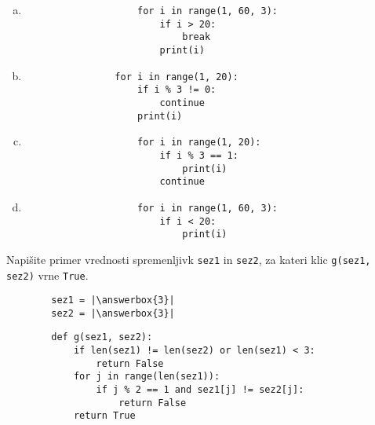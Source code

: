 \documentclass[arhiv, 10pt]{../izpit}
\newcommand{\inlinepy}[1]{\texttt{#1}}
\newcommand{\answerbox}[1]{\framebox{\vphantom{\large M}\hspace{#1cm}}}
\begin{document}
        \begin{multicols}{2}
        \begin{enumerate}[(a)]
\item 
                \begin{verbatim}
                    for i in range(1, 60, 3):
                        if i > 20:
                            break
                        print(i)
                \end{verbatim}
            
\item 
            \begin{verbatim}
                for i in range(1, 20):
                    if i % 3 != 0:
                        continue
                    print(i)
            \end{verbatim}
        
\item 
                \begin{verbatim}
                    for i in range(1, 20):
                        if i % 3 == 1:
                            print(i)
                        continue
                \end{verbatim}
            
\item 
                \begin{verbatim}
                    for i in range(1, 60, 3):
                        if i < 20:
                            print(i)
                \end{verbatim}
            
\end{enumerate}

        \end{multicols}
    
        \naloga*
        \begin{multicols}{2}
        \noindent
        Napišite primer vrednosti spremenljivk \inlinepy{sez1} in \inlinepy{sez2}, za kateri klic \inlinepy{g(sez1, sez2)} vrne \inlinepy{True}.
        \begin{verbatim}
        sez1 = |\answerbox{3}|
        sez2 = |\answerbox{3}|
        \end{verbatim}
        \vfil
        \columnbreak
        \begin{verbatim}
        def g(sez1, sez2):
            if len(sez1) != len(sez2) or len(sez1) < 3:
                return False
            for j in range(len(sez1)):
                if j % 2 == 1 and sez1[j] != sez2[j]:
                    return False
            return True
        \end{verbatim}
        \end{multicols}
    
\end{document}
